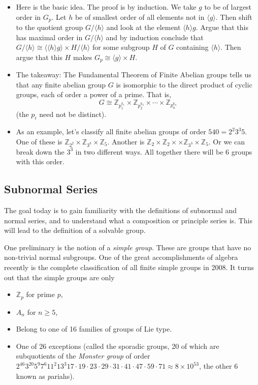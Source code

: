 \documentclass[12pt]{article}
\theoremstyle{plain}
\theoremstyle{definition}
\theoremstyle{remark}
\def\Z{\mathbb Z}
\newcommand{\todayis}[1]{\clearpage{\rhead{\footnotesize #1}}}
\begin{document}
\begin{itemize}
\item Here is the basic idea.  The proof is by induction.  We take $g$ to be of largest order in $G_p$.  Let $h$ be of smallest order of all elements not in $\langle g\rangle$.  Then shift to the quotient group $G/\langle h\rangle$ and look at the element $\langle h\rangle g$.  Argue that this has maximal order in $G/\langle h\rangle$ and by induction conclude that $G/\langle h\rangle \cong \langle \langle h\rangle g\rangle \times H/\langle h\rangle$ for some subgroup $H$ of $G$ containing $\langle h\rangle$.  Then argue that this $H$ makes $G_p \cong \langle g \rangle \times H$.

\item The takeaway: The Fundamental Theorem of Finite Abelian groups tells us that any finite abelian group $G$ is isomorphic to the direct product of cyclic groups, each of order a power of a prime.  That is, 
\[G \cong \Z_{p_1^{k_1}}\times \Z_{p_2^{k_2}}\times \cdots \times\Z_{p_n^{k_n}}\]
(the $p_i$ need not be distinct).

\item As an example, let's classify all finite abelian groups of order $540 = 2^2 3^3 5$.  One of these is $\Z_{2^2} \times \Z_{3^3} \times \Z_5$.  Another is $\Z_{2}\times\Z_2\times\times \Z_{3^3} \times \Z_5$.  Or we can break down the $3^3$ in two different ways.  All together there will be 6 groups with this order.

\end{itemize}



\todayis{Monday, March 25}

\subsection*{Subnormal Series}

The goal today is to gain familiarity with the definitions of subnormal and normal series, and to understand what a composition or principle series is.  This will lead to the definition of a solvable group.

One preliminary is the notion of a \emph{simple group}.  These are groups that have no non-trivial normal subgroups.  One of the great accomplishments of algebra recently is the complete classification of all finite simple groups in 2008.  It turns out that the simple groups are only
\begin{itemize}
\item $\Z_p$ for prime $p$,
\item $A_n$ for $n \ge 5$,
\item Belong to one of 16 families of groups of Lie type.
\item One of 26 exceptions (called the sporadic groups, 20 of which are subquotients of the \emph{Monster group} of order $2^{46} 3^{20}5^9 7^6 11^2 13^3 17 \cdot 19 \cdot 23 \cdot 29 \cdot 31 \cdot 41 \cdot 47 \cdot 59 \cdot 71 \approx 8\times 10^{53}$, the other 6 known as {\emph pariahs}).
\end{itemize}
\end{document}
